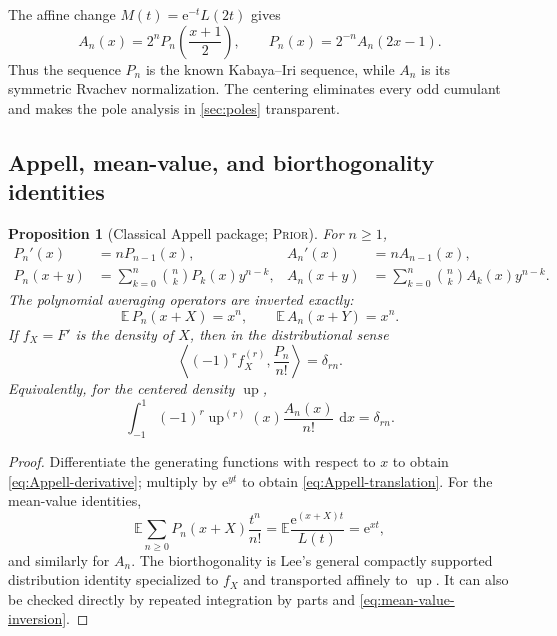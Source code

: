 \documentclass[11pt,oneside]{article}
\theoremstyle{frontier}
\newtheorem{proposition}[theorem]{Proposition}
\theoremstyle{definition}
\theoremstyle{remark}
\newcommand{\e}{\mathrm e}
\newcommand{\dd}{\,\mathrm d}
\newcommand{\Up}{\operatorname{up}}
\newcommand{\statuslit}{\textsc{Prior}}
\begin{document}
The affine change $M(t)=\e^{-t}L(2t)$ gives
\begin{equation}
 \boxed{
 A_n(x)=2^nP_n\!\left(\frac{x+1}{2}\right),
 \qquad
 P_n(x)=2^{-n}A_n(2x-1).
 }
 \label{eq:A-P-affine}
\end{equation}
Thus the sequence $P_n$ is the known Kabaya--Iri sequence, while $A_n$ is its symmetric Rvachev
normalization.  The centering eliminates every odd cumulant and makes the pole analysis in
\cref{sec:poles} transparent.

\subsection{Appell, mean-value, and biorthogonality identities}

\begin{proposition}[Classical Appell package; \statuslit]
\label{prop:Appell-package}
For $n\ge1$,
\begin{align}
 P_n'(x)&=nP_{n-1}(x),
 &A_n'(x)&=nA_{n-1}(x),
 \label{eq:Appell-derivative}\\
 P_n(x+y)&=\sum_{k=0}^n\binom nkP_k(x)y^{n-k},
 &A_n(x+y)&=\sum_{k=0}^n\binom nkA_k(x)y^{n-k}.
 \label{eq:Appell-translation}
\end{align}
The polynomial averaging operators are inverted exactly:
\begin{equation}
 \boxed{
 \mathbb E\,P_n(x+X)=x^n,
 \qquad
 \mathbb E\,A_n(x+Y)=x^n.
 }
 \label{eq:mean-value-inversion}
\end{equation}
If $f_X=F'$ is the density of $X$, then in the distributional sense
\begin{equation}
 \left\langle(-1)^r f_X^{(r)},\frac{P_n}{n!}\right\rangle=\delta_{rn}.
 \label{eq:P-biorthogonal}
\end{equation}
Equivalently, for the centered density $\Up$,
\begin{equation}
 \int_{-1}^{1}(-1)^r\Up^{(r)}(x)\frac{A_n(x)}{n!}\,\dd x
 =\delta_{rn}.
 \label{eq:A-biorthogonal}
\end{equation}
\end{proposition}

\begin{proof}
Differentiate the generating functions with respect to $x$ to obtain
\eqref{eq:Appell-derivative}; multiply by $\e^{yt}$ to obtain
\eqref{eq:Appell-translation}.  For the mean-value identities,
\[
 \mathbb E\sum_{n\ge0}P_n(x+X)\frac{t^n}{n!}
 =\mathbb E\frac{\e^{(x+X)t}}{L(t)}=\e^{xt},
\]
and similarly for $A_n$.  The biorthogonality is Lee's general compactly supported
distribution identity specialized to $f_X$ and transported affinely to $\Up$.  It can also be checked
directly by repeated integration by parts and \eqref{eq:mean-value-inversion}.
\end{proof}
\end{document}
